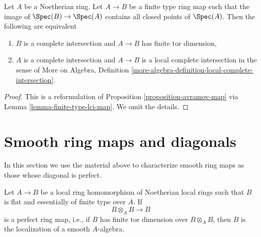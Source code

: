 \begin{lemma}
\label{lemma-avramov-map-finite-type}
Let $A$ be a Noetherian ring. Let $A \to B$ be a finite type ring map
such that the image of $\Spec(B) \to \Spec(A)$ contains all closed
points of $\Spec(A)$. Then the following are equivalent
\begin{enumerate}
\item $B$ is a complete intersection and $A \to B$ has finite
tor dimension,
\item $A$ is a complete intersection and $A \to B$ is a local complete
intersection in the sense of More on Algebra, Definition
\ref{more-algebra-definition-local-complete-intersection}.
\end{enumerate}
\end{lemma}

\begin{proof}
This is a reformulation of Proposition \ref{proposition-avramov-map}
via Lemma \ref{lemma-finite-type-lci-map}.
We omit the details.
\end{proof}








\section{Smooth ring maps and diagonals}
\label{section-smooth-diagonal-perfect}

\noindent
In this section we use the material above to characterize smooth ring maps as
those whose diagonal is perfect.

\begin{lemma}
\label{lemma-local-perfect-diagonal}
Let $A \to B$ be a local ring homomorphism of Noetherian local rings such that
$B$ is flat and essentially of finite type over $A$. If
$$
B \otimes_A B \longrightarrow B
$$
is a perfect ring map, i.e., if $B$ has finite tor dimension over
$B \otimes_A B$, then $B$ is the localization of a smooth $A$-algebra.
\end{lemma}

